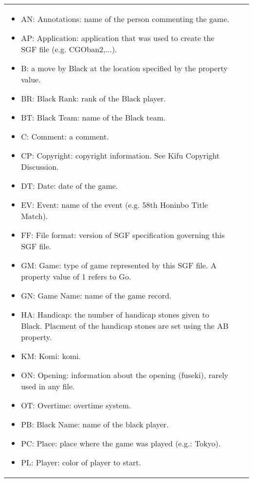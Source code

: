 \begin{longtable}{|p{\varnamewidth}|p{\vardescrwidth}|l}
\begin{itemize}
\item AN: Annotations: name of the person commenting the game.

\item AP: Application: application that was used to create the SGF file (e.g. CGOban2,...).

\item B: a move by Black at the location specified by the property value.

\item BR: Black Rank: rank of the Black player.

\item BT: Black Team: name of the Black team.

\item C: Comment: a comment.

\item CP: Copyright: copyright information. See Kifu Copyright Discussion.

\item DT: Date: date of the game.

\item EV: Event: name of the event (e.g. 58th Honinbo Title Match).

\item FF: File format: version of SGF specification governing this SGF file.

\item GM: Game: type of game represented by this SGF file. A property value of 1 refers to Go.

\item GN: Game Name: name of the game record.

\item HA: Handicap: the number of handicap stones given to Black. Placment of the handicap stones are set using the AB property.

\item KM: Komi: komi.

\item ON: Opening: information about the opening (fuseki), rarely used in any file.

\item OT: Overtime: overtime system.

\item PB: Black Name: name of the black player.

\item PC: Place: place where the game was played (e.g.: Tokyo).

\item PL: Player: color of player to start.


\end{itemize}
\end{longtable}
